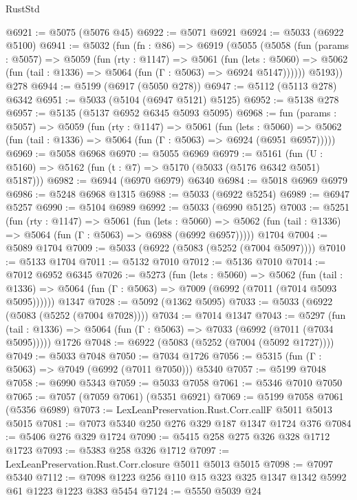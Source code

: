 \begin{lexlean}{RustStd}
\begin{coremodule}
{\begin{coremodule}
{{{{{{{{{{{{{{{{{{{{{{{{{{{{{{{{{{@6921 := @5075 (@5076 @45)
@6922 := @5071 @6921
@6924 := @5033 (@6922 @5100)
@6941 := @5032
    (fun (fn : @86) =>
    @6919
      (@5055
        (@5058
          (fun (params : @5057) =>
          @5059
            (fun (rty : @1147) =>
            @5061
              (fun (lets : @5060) =>
              @5062 (fun (tail : @1336) => @5064 (fun (Γ : @5063) => @6924 @5147))))))
        @5193))
    @278
@6944 := @5199 (@6917 (@5050 @278))
@6947 := @5112 (@5113 @278) @6342
@6951 := @5033 (@5104 (@6947 @5121) @5125)
@6952 := @5138 @278
@6957 := @5135 (@5137 @6952 @6345 @5093 @5095)
@6968 := fun (params : @5057) =>
  @5059
    (fun (rty : @1147) =>
    @5061
      (fun (lets : @5060) =>
      @5062 (fun (tail : @1336) => @5064 (fun (Γ : @5063) => @6924 (@6951 @6957)))))
@6969 := @5058 @6968
@6970 := @5055 @6969
@6979 := @5161 (fun (U : @5160) => @5162 (fun (t : @7) => @5170 (@5033 (@5176 @6342 @5051) @5187)))
@6982 := @6944 (@6970 @6979) @6340
@6984 := @5018 @6969 @6979
@6986 := @5248 @6968 @1315
@6988 := @5033 (@6922 @5254)
@6989 := @6947 @5257
@6990 := @5104 @6989
@6992 := @5033 (@6990 @5125)
@7003 := @5251
    (fun (rty : @1147) =>
    @5061
      (fun (lets : @5060) =>
      @5062 (fun (tail : @1336) => @5064 (fun (Γ : @5063) => @6988 (@6992 @6957)))))
    @1704
@7004 := @5089 @1704
@7009 := @5033 (@6922 (@5083 (@5252 (@7004 @5097))))
@7010 := @5133 @1704
@7011 := @5132 @7010
@7012 := @5136 @7010
@7014 := @7012 @6952 @6345
@7026 := @5273
    (fun (lets : @5060) =>
    @5062
      (fun (tail : @1336) => @5064 (fun (Γ : @5063) => @7009 (@6992 (@7011 (@7014 @5093 @5095))))))
    @1347
@7028 := @5092 (@1362 @5095)
@7033 := @5033 (@6922 (@5083 (@5252 (@7004 @7028))))
@7034 := @7014 @1347
@7043 := @5297
    (fun (tail : @1336) => @5064 (fun (Γ : @5063) => @7033 (@6992 (@7011 (@7034 @5095)))))
    @1726
@7048 := @6922 (@5083 (@5252 (@7004 (@5092 @1727))))
@7049 := @5033 @7048
@7050 := @7034 @1726
@7056 := @5315 (fun (Γ : @5063) => @7049 (@6992 (@7011 @7050))) @5340
@7057 := @5199 @7048
@7058 := @6990 @5343
@7059 := @5033 @7058
@7061 := @5346 @7010 @7050
@7065 := @7057 (@7059 @7061) (@5351 @6921)
@7069 := @5199 @7058 @7061 (@5356 @6989)
@7073 := LexLeanPreservation.Rust.Corr.callF @5011 @5013 @5015
@7081 := @7073 @5340 @250 @276 @329 @187 @1347 @1724 @376
@7084 := @5406 @276 @329 @1724
@7090 := @5415 @258 @275 @326 @328 @1712 @1723
@7093 := @5383 @258 @326 @1712
@7097 := LexLeanPreservation.Rust.Corr.closure @5011 @5013 @5015
@7098 := @7097 @5340
@7112 := @7098 @1223 @256 @110 @15 @323 @325 @1347 @1342 @5992 @61 @1223 @1223 @383 @5454
@7124 := @5550
    @5039
    @24
}}}}}}}}}}}}}}}}}}}}}}}}}}}}}}}}}}
\end{coremodule}}
\end{coremodule}
\end{lexlean}
